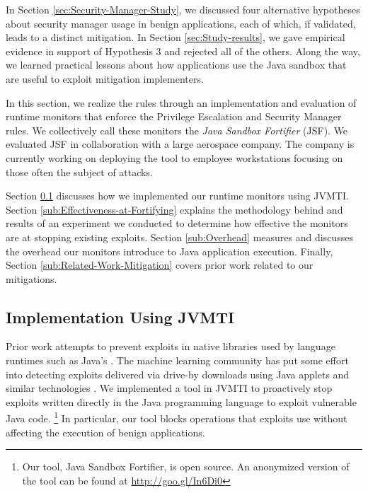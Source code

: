 \documentclass{sig-alternate}
\begin{document}
In Section \ref{sec:Security-Manager-Study}, we discussed four alternative
hypotheses about security manager usage in benign applications, each
of which, if validated, leads to a distinct mitigation. In Section
\ref{sec:Study-results}, we gave empirical evidence in support of
Hypothesis 3 and rejected all of the others. Along the way, we learned
practical lessons about how applications use the Java sandbox that
are useful to exploit mitigation implementers. 

In this section, we realize the rules through an implementation and
evaluation of runtime monitors that enforce the Privilege Escalation
and Security Manager rules. We collectively call these monitors the
\textit{Java Sandbox Fortifier} (JSF). We evaluated JSF in collaboration
with a large aerospace company. The company is currently working on
deploying the tool to employee workstations focusing on those often
the subject of attacks. 

Section \ref{sub:Implementation-Using-JVMTI} discusses how we implemented
our runtime monitors using JVMTI. Section \ref{sub:Effectiveness-at-Fortifying}
explains the methodology behind and results of an experiment we conducted
to determine how effective the monitors are at stopping existing exploits.
Section \ref{sub:Overhead} measures and discusses the overhead our
monitors introduce to Java application execution. Finally, Section
\ref{sub:Related-Work-Mitigation} covers prior work related to our
mitigations.


\subsection{Implementation Using JVMTI}\label{sub:Implementation-Using-JVMTI}

Prior work attempts to prevent exploits in native libraries used by
language runtimes such as Java's \cite{cappos_retaining_2010,li_quarantine:_2011,siefers_robusta:_2010,sun_jvm-portable_2012}.
The machine learning community has put some effort into detecting
exploits delivered via drive-by downloads using Java applets and similar
technologies \cite{cova_detection_2010,ford_analyzing_2009,helmer_anomalous_2001,schlumberger_jarhead_2012}.
We implemented a tool in JVMTI to proactively stop exploits written
directly in the Java programming language to exploit vulnerable Java
code.%
\footnote{Our tool, Java Sandbox Fortifier, is open source. An anonymized version
of the tool can be found at \url{http://goo.gl/In6Di0}%
} In particular, our tool blocks operations that exploits use without
affecting the execution of benign applications.
\end{document}
